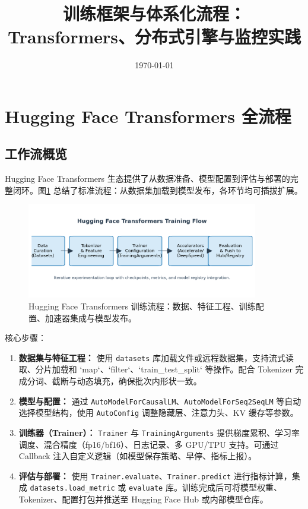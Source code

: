 \documentclass[UTF8,zihao=-4]{ctexart}
\title{训练框架与体系化流程：Transformers、分布式引擎与监控实践}
\author{}
\date{\today}
\begin{document}
\maketitle

\section{Hugging Face Transformers 全流程}
\subsection{工作流概览}
Hugging Face Transformers 生态提供了从数据准备、模型配置到评估与部署的完整闭环。图\ref{fig:hf_pipeline_cn} 总结了标准流程：从数据集加载到模型发布，各环节均可插拔扩展。
\begin{figure}[H]
  \centering
  \includegraphics[width=0.9\textwidth]{hf_training_pipeline.png}
  \caption{Hugging Face Transformers 训练流程：数据、特征工程、训练配置、加速器集成与模型发布。}
  \label{fig:hf_pipeline_cn}
\end{figure}
核心步骤：
\begin{enumerate}
  \item \textbf{数据集与特征工程：} 使用 \texttt{datasets} 库加载文件或远程数据集，支持流式读取、分片加载和 `map`、`filter`、`train\_test\_split` 等操作。配合 Tokenizer 完成分词、截断与动态填充，确保批次内形状一致。
  \item \textbf{模型与配置：} 通过 \texttt{AutoModelForCausalLM}、\texttt{AutoModelForSeq2SeqLM} 等自动选择模型结构，使用 \texttt{AutoConfig} 调整隐藏层、注意力头、KV 缓存等参数。
  \item \textbf{训练器（Trainer）：} \texttt{Trainer} 与 \texttt{TrainingArguments} 提供梯度累积、学习率调度、混合精度（fp16/bf16）、日志记录、多 GPU/TPU 支持。可通过 Callback 注入自定义逻辑（如模型保存策略、早停、指标上报）。
  \item \textbf{评估与部署：} 使用 \texttt{Trainer.evaluate}、\texttt{Trainer.predict} 进行指标计算，集成 \texttt{datasets.load\_metric} 或 \texttt{evaluate} 库。训练完成后可将模型权重、Tokenizer、配置打包并推送至 Hugging Face Hub 或内部模型仓库。
\end{enumerate}
\end{document}
